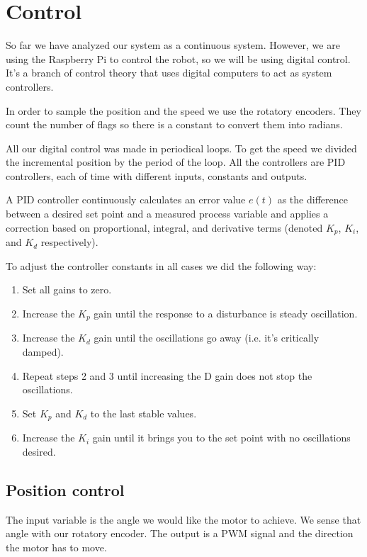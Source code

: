 \section{Control}
So far we have analyzed our system as a continuous system.
However, we are using the Raspberry Pi to control the robot, so we will
be using digital control. It's a branch of control theory that uses
digital computers to act as system controllers.

In order to sample the position and the speed we use the rotatory encoders.
They count the number of flags so there is a constant to convert them into radians.

All our digital control was made in periodical loops. To get the speed we
divided the incremental position by the period of the loop. All the controllers
are PID controllers, each of time with different inputs, constants and outputs.

A PID controller continuously calculates an error value $e(t)$ as the difference between
a desired set point and a measured process variable and applies a
correction based on proportional, integral, and derivative terms
(denoted $K_p$, $K_i$, and $K_d$ respectively).

To adjust the controller constants in all cases we did the following way:

\begin{enumerate}
    \item Set all gains to zero.
    \item Increase the $K_p$ gain until the response to a disturbance is steady oscillation.
    \item Increase the $K_d$ gain until the oscillations go away (i.e. it's critically damped).
    \item Repeat steps 2 and 3 until increasing the D gain does not stop the oscillations.
    \item Set $K_p$ and $K_d$ to the last stable values.
    \item Increase the $K_i$ gain until it brings you to the set point with no oscillations desired.
\end{enumerate}

\subsection{Position control}
The input variable is the angle we would like the motor to achieve. We sense that angle
with our rotatory encoder. The output is a PWM signal and the direction the motor has to move.

